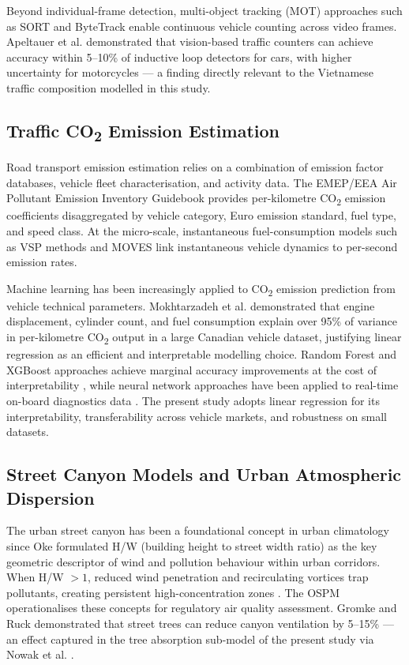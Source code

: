 \documentclass[12pt,a4paper]{article}
\begin{document}
Beyond individual-frame detection, multi-object tracking (MOT) approaches such as SORT \cite{Bewley2016} and ByteTrack \cite{Zhang2022} enable continuous vehicle counting across video frames. Apeltauer et al. \cite{Apeltauer2015} demonstrated that vision-based traffic counters can achieve accuracy within 5--10\% of inductive loop detectors for cars, with higher uncertainty for motorcycles --- a finding directly relevant to the Vietnamese traffic composition modelled in this study.

\subsection{Traffic CO\textsubscript{2} Emission Estimation}

Road transport emission estimation relies on a combination of emission factor databases, vehicle fleet characterisation, and activity data. The EMEP/EEA Air Pollutant Emission Inventory Guidebook \cite{EEA2023} provides per-kilometre CO\textsubscript{2} emission coefficients disaggregated by vehicle category, Euro emission standard, fuel type, and speed class. At the micro-scale, instantaneous fuel-consumption models such as VSP methods \cite{Jimenez1999} and MOVES \cite{EPA2014} link instantaneous vehicle dynamics to per-second emission rates.

Machine learning has been increasingly applied to CO\textsubscript{2} emission prediction from vehicle technical parameters. Mokhtarzadeh et al. \cite{Mokhtarzadeh2021} demonstrated that engine displacement, cylinder count, and fuel consumption explain over 95\% of variance in per-kilometre CO\textsubscript{2} output in a large Canadian vehicle dataset, justifying linear regression as an efficient and interpretable modelling choice. Random Forest and XGBoost approaches achieve marginal accuracy improvements at the cost of interpretability \cite{Biswas2023,Shafique2023}, while neural network approaches have been applied to real-time on-board diagnostics data \cite{Gu2021}. The present study adopts linear regression for its interpretability, transferability across vehicle markets, and robustness on small datasets.

\subsection{Street Canyon Models and Urban Atmospheric Dispersion}

The urban street canyon has been a foundational concept in urban climatology since Oke \cite{Oke1988} formulated H/W (building height to street width ratio) as the key geometric descriptor of wind and pollution behaviour within urban corridors. When H/W $> 1$, reduced wind penetration and recirculating vortices trap pollutants, creating persistent high-concentration zones \cite{Vardoulakis2003,XieCastro2006}. The OSPM \cite{Berkowicz2000} operationalises these concepts for regulatory air quality assessment. Gromke and Ruck \cite{GromkeRuck2007} demonstrated that street trees can reduce canyon ventilation by 5--15\% --- an effect captured in the tree absorption sub-model of the present study via Nowak et al. \cite{Nowak2013}.
\end{document}
